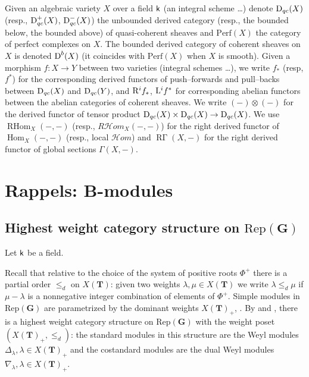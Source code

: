 \documentclass[sn-mathphys-num]{sn-jnl}%
\newcommand{\Rep}{{\mathrm{Rep}}}
\newcommand{\Perf}{{\mathrm{Perf}}}
\newcommand*{\Dd}{\mathop{\mathrm D\kern0pt}\nolimits}
\newcommand*{\RGamma}{\mathop{\mathrm {R\Gamma}}\nolimits}
\newcommand*{\Hom}{\mathop{\mathrm {Hom}}\nolimits}
\newcommand*{\RHom}{\mathop{\mathrm {RHom}}\nolimits}
\newcommand{\sk}{{\sf k}}
\newcommand{\bg}{\mathbf G}
\newcommand{\fb}{\mathbf B}
\newcommand{\bt}{\mathbf T}
\theoremstyle{definition}
\begin{document}
Given an algebraic variety $X$ over a field $\sk$ (an integral scheme \dots ) denote 
$\Dd _{qc}(X)$ (resp., $\Dd _{qc}^+(X)$, $\Dd _{qc}^-(X)$) the unbounded derived category (resp., the bounded below, the bounded above) of quasi-coherent sheaves and $\Perf(X)$ the category of perfect complexes on $X$. 
The bounded derived category of coherent sheaves on $X$ is denoted $\Dd ^b(X)$ (it coincides with $\Perf(X)$ when $X$ is smooth).
Given a morphism $f:X\rightarrow Y$ between two varieties (integral schemes \dots), we write $f_{\ast}$ (resp, $f^{\ast}$) for the corresponding derived functors of push--forwards and pull--backs between $\Dd _{qc}(X)$ and $\Dd _{qc}(Y)$,
 and ${\rm R}^if_{\ast}$, ${\rm L}^if^{\ast}$ for corresponding abelian functors between the abelian categories of coherent sheaves. 
 We write $(-)\otimes(-)$ for the derived functor of tensor product $\Dd _{qc}(X)\times \Dd _{qc}(X)\rightarrow \Dd _{qc}(X)$. We use $\RHom _X(-,-)$  (resp., 
$R{\mathcal Hom}_X(-,-)$) for the right derived functor of $\Hom_X(-,-)$ (resp., 
local ${\mathcal Hom}$) and $\RGamma (X,-)$ for the right derived functor of global sections $\Gamma (X,-)$.

\section{Rappels: $\fb$-modules}\label{sec:rappelB-mod}

\subsection{Highest weight category structure on $\Rep( \bg)$}\label{subsec:hwc_repG}
Let $\sk$ be a field.

Recall that relative to the choice of the system of positive roots $\Phi ^+$ there is a partial order $\leq_d$ on $X( \bt)$: 
given two weights $\lambda,\mu \in X( \bt)$ we write $\lambda \leq_d\mu$ if $\mu -\lambda $ is a nonnegative integer combination of elements of $\Phi ^+$.
Simple modules in $\Rep( \bg)$ are parametrized by the dominant weights $X(\bt)_+$, \cite[II, Section 2]{Jan}. 
By \cite{CPSHW} and \cite{Donkin1}, there is a highest weight category structure on $\Rep( \bg)$ with the weight poset 
$(X(\bt)_+,\leq_d)$: the standard modules in this structure are the Weyl modules $\Delta _{\lambda},\lambda \in X(\bt)_+$ and the costandard modules are the dual Weyl modules $\nabla _{\lambda},\lambda \in X(\bt)_+$.
\end{document}
